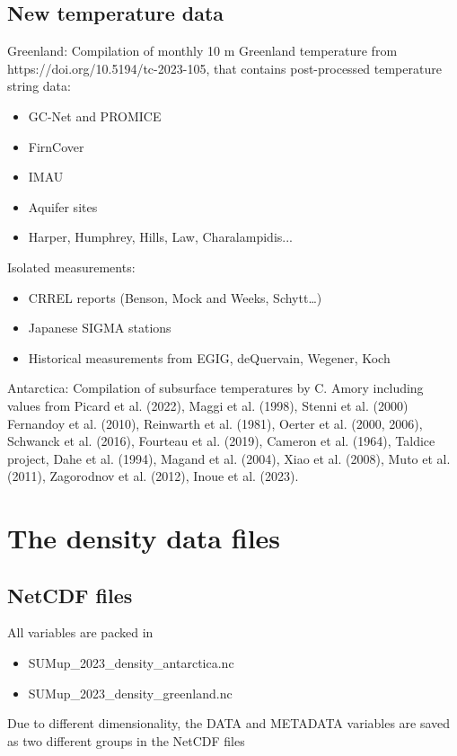 \documentclass[journal abbreviation, manuscript]{copernicus}
\begin{document}
\subsection{New temperature data}

Greenland:
Compilation of monthly 10 m Greenland temperature from https://doi.org/10.5194/tc-2023-105, that contains post-processed temperature string data:
\begin{itemize}
\item GC-Net and PROMICE
\item FirnCover
\item IMAU
\item Aquifer sites
\item Harper, Humphrey, Hills, Law, Charalampidis...
\end{itemize}
Isolated measurements:
\begin{itemize}
\item CRREL reports (Benson, Mock and Weeks, Schytt…)
\item Japanese SIGMA stations
\item Historical measurements from EGIG, deQuervain, Wegener, Koch
\end{itemize}

\bigskip
Antarctica:
Compilation of subsurface temperatures by C. Amory including values from Picard et al. (2022), Maggi et al. (1998), Stenni et al. (2000) Fernandoy et al. (2010), Reinwarth et al. (1981), Oerter et al. (2000, 2006), Schwanck et al. (2016), Fourteau et al. (2019), Cameron et al. (1964), Taldice project, Dahe et al. (1994), Magand et al. (2004), Xiao et al. (2008), Muto et al. (2011), Zagorodnov et al. (2012), Inoue et al. (2023).


\section{The density data files}
\subsection{NetCDF files}

All variables are packed in 
\begin{itemize}
\item SUMup\_2023\_density\_antarctica.nc
\item SUMup\_2023\_density\_greenland.nc
\end{itemize}

Due to different dimensionality, the DATA and METADATA variables are saved as two different groups in the NetCDF files
\end{document}
